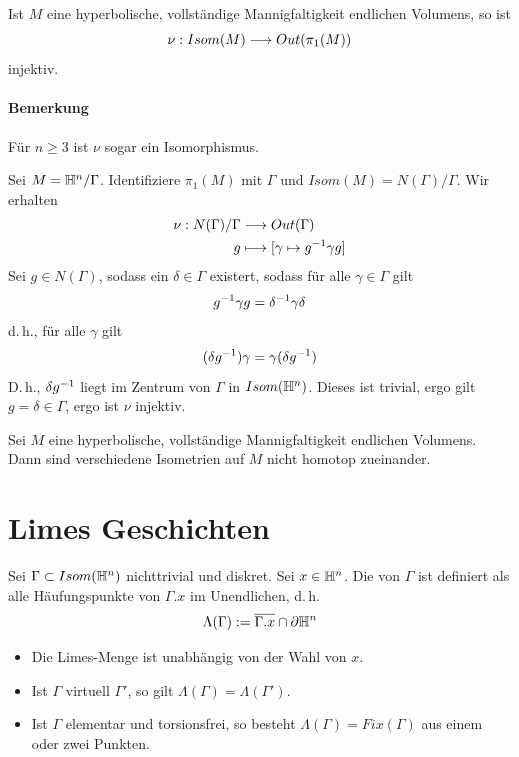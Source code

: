 \documentclass{book}
\begin{document}
\Prop{}
Ist $M$ eine hyperbolische, vollständige Mannigfaltigkeit endlichen Volumens, so ist
\[ \nu : Isom(M) \overset{}{\longrightarrow} Out(\pi_1(M)) \]
injektiv.
\paragraph{Bemerkung} Für $n\geq 3$ ist $\nu$ sogar ein Isomorphismus.
\begin{Beweis}{}
	Sei $M = \mathbb{H}^n /\Gamma$. Identifiziere $\pi_1(M)$ mit $\Gamma$ und $Isom(M) = N(\Gamma) / \Gamma$. Wir erhalten
	\begin{align*}
	\nu : N(\Gamma) / \Gamma &\overset{}{\longrightarrow} Out(\Gamma)\\
	g & \longmapsto [ \gamma \mapsto g^{-1} \gamma g ]
	\end{align*}
Sei $g \in N(\Gamma)$, sodass ein $\delta \in \Gamma$ existert, sodass für alle $\gamma\in \Gamma$ gilt
\[ g^{-1} \gamma g = \delta^{-1} \gamma \delta \]
d.\,h., für alle $\gamma$ gilt
\[ (\delta g^{-1}) \gamma = \gamma (\delta g^{-1}) \]
D.\,h., $\delta g^{-1}$ liegt im Zentrum von $\Gamma$ in $Isom(\mathbb{H}^n)$. Dieses ist trivial, ergo gilt $g = \delta  \in \Gamma$, ergo ist $\nu$ injektiv.
\end{Beweis}

\Kor{}
Sei $M$ eine hyperbolische, vollständige Mannigfaltigkeit endlichen Volumens. Dann sind verschiedene Isometrien auf $M$ nicht homotop zueinander.

\section{Limes Geschichten}
\Def{}
Sei $\Gamma \subset Isom(\mathbb{H}^n)$ nichttrivial und diskret. Sei $x \in \mathbb{H}^n$. Die  von $\Gamma$ ist definiert als alle Häufungspunkte von $\Gamma.x$ im Unendlichen, d.\,h.
\[ \Lambda(\Gamma) := \overline{\Gamma.x} \cap \partial \mathbb{H}^n \]
\Bem{}
\begin{itemize}
	\item Die Limes-Menge ist unabhängig von der Wahl von $x$.
	\item Ist $\Gamma$ virtuell $\Gamma'$, so gilt $\Lambda(\Gamma) = \Lambda(\Gamma')$.
	\item Ist $\Gamma$ elementar und torsionsfrei, so besteht $\Lambda(\Gamma) = Fix(\Gamma)$ aus einem oder zwei Punkten.
\end{itemize}
\end{document}

